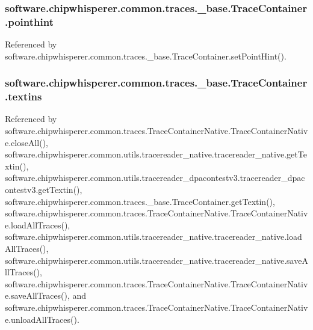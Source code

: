 \subsubsection[{pointhint}]{\setlength{\rightskip}{0pt plus 5cm}software.\+chipwhisperer.\+common.\+traces.\+\_\+base.\+Trace\+Container.\+pointhint}\label{classsoftware_1_1chipwhisperer_1_1common_1_1traces_1_1__base_1_1TraceContainer_a6385d276065704b43e1d7867098a235c}


Referenced by software.\+chipwhisperer.\+common.\+traces.\+\_\+base.\+Trace\+Container.\+set\+Point\+Hint().

\hypertarget{classsoftware_1_1chipwhisperer_1_1common_1_1traces_1_1__base_1_1TraceContainer_a3cae69df92363a7d0740827d18e62ce2}{}
\subsubsection[{textins}]{\setlength{\rightskip}{0pt plus 5cm}software.\+chipwhisperer.\+common.\+traces.\+\_\+base.\+Trace\+Container.\+textins}\label{classsoftware_1_1chipwhisperer_1_1common_1_1traces_1_1__base_1_1TraceContainer_a3cae69df92363a7d0740827d18e62ce2}


Referenced by software.\+chipwhisperer.\+common.\+traces.\+Trace\+Container\+Native.\+Trace\+Container\+Native.\+close\+All(), software.\+chipwhisperer.\+common.\+utils.\+tracereader\+\_\+native.\+tracereader\+\_\+native.\+get\+Textin(), software.\+chipwhisperer.\+common.\+utils.\+tracereader\+\_\+dpacontestv3.\+tracereader\+\_\+dpacontestv3.\+get\+Textin(), software.\+chipwhisperer.\+common.\+traces.\+\_\+base.\+Trace\+Container.\+get\+Textin(), software.\+chipwhisperer.\+common.\+traces.\+Trace\+Container\+Native.\+Trace\+Container\+Native.\+load\+All\+Traces(), software.\+chipwhisperer.\+common.\+utils.\+tracereader\+\_\+native.\+tracereader\+\_\+native.\+load\+All\+Traces(), software.\+chipwhisperer.\+common.\+utils.\+tracereader\+\_\+native.\+tracereader\+\_\+native.\+save\+All\+Traces(), software.\+chipwhisperer.\+common.\+traces.\+Trace\+Container\+Native.\+Trace\+Container\+Native.\+save\+All\+Traces(), and software.\+chipwhisperer.\+common.\+traces.\+Trace\+Container\+Native.\+Trace\+Container\+Native.\+unload\+All\+Traces().

